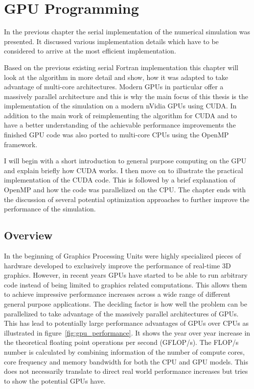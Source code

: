 \documentclass[a4paper,11pt]{kth-mag}
\begin{document}
\chapter{GPU Programming}
In the previous chapter the serial implementation of the numerical simulation was presented. It discussed various implementation details which have to be considered to arrive at the most efficient implementation.

Based on the previous existing serial Fortran implementation this chapter will look at the algorithm in more detail and show, how it was adapted to take advantage of multi-core architectures. Modern GPUs in particular offer a massively parallel architecture and this is why the main focus of this thesis is the implementation of the simulation on a modern nVidia GPUs using CUDA. In addition to the main work of reimplementing the algorithm for CUDA and to have a better understanding of the achievable performance improvements the finished GPU code was also ported to multi-core CPUs using the OpenMP framework.

I will begin with a short introduction to general purpose computing on the GPU and explain briefly how CUDA works. I then move on to illustrate the practical implementation of the CUDA code. This is followed by a brief explanation of OpenMP and how the code was parallelized on the CPU. The chapter ends with the discussion of several potential optimization approaches to further improve the performance of the simulation.

\section{Overview}
In the beginning of Graphics Processing Units were highly specialized pieces of hardware developed to exclusively improve the performance of real-time 3D graphics. However, in recent years GPUs have started to be able to run arbitrary code instead of being limited to graphics related computations. This allows them to achieve impressive performance increases across a wide range of different general purpose applications. The deciding factor is how well the problem can be parallelized to take advantage of the massively parallel architectures of GPUs. This has lead to potentially large performance advantages of GPUs over CPUs as illustrated in figure~\ref{fig:gpu_performance}. It shows the year over year increase in the theoretical floating point operations per second (GFLOP/s). The FLOP/s number is calculated by combining information of the number of compute cores, core frequency and memory bandwidth for both the CPU and GPU models. This does not necessarily translate to direct real world performance increases but tries to show the potential GPUs have.
\end{document}
